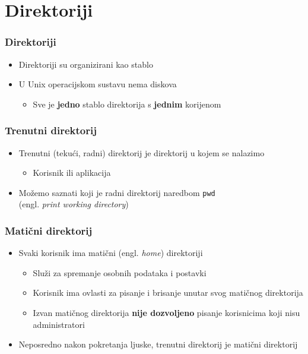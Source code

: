 \documentclass{beamer}
\begin{document}
\section{Direktoriji}
\begin{frame}[t]
\frametitle{Direktoriji}
\begin{itemize}
  \item Direktoriji su organizirani kao stablo
  \item U Unix operacijskom sustavu nema diskova
  \begin{itemize}
    \item Sve je \textbf{jedno} stablo direktorija s \textbf{jednim}
          korijenom
  \end{itemize}
  \centering
\end{itemize}
\end{frame}


\begin{frame}[t]
\frametitle{Trenutni direktorij}
\begin{itemize}
  \item Trenutni (tekući, radni) direktorij je direktorij u kojem se
        nalazimo
  \begin{itemize}
    \item Korisnik ili aplikacija
  \end{itemize}
  \item Možemo saznati koji je radni direktorij naredbom \texttt{pwd}
        \\(engl. \emph{print working directory})
\end{itemize}
\end{frame}

\begin{frame}[t]
\frametitle{Matični direktorij}
\begin{itemize}
  \item Svaki korisnik ima matični (engl. \emph{home}) direktoriji
  \begin{itemize}
    \item Služi za spremanje osobnih podataka i postavki
    \item Korisnik ima ovlasti za pisanje i brisanje unutar svog matičnog
          direktorija
    \item Izvan matičnog direktorija \textbf{nije dozvoljeno} pisanje
          korisnicima koji nisu administratori
  \end{itemize}
  \item Neposredno nakon pokretanja ljuske, trenutni direktorij je matični
        direktorij
\end{itemize}
\end{frame}
\end{document}
